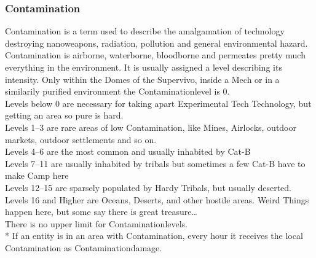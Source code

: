     \subsubsection{Contamination}
    Contamination is a term used to describe the amalgamation of technology destroying nanoweapons, radiation, pollution
    and general environmental hazard.
    Contamination is airborne, waterborne, bloodborne and permeates pretty much
    everything in the environment.
    It is usually assigned a level describing its intensity.
    Only within the Domes
    of the Supervivo, inside a Mech or in a similarily purified environment the Contaminationlevel is 0. \\
    Levels below 0 are necessary for taking apart Experimental Tech Technology, but getting an area so pure is hard.\\
    Levels 1--3
    are rare areas of low Contamination, like Mines, Airlocks, outdoor markets, outdoor settlements and so on. \\
    Levels 4--6
    are the most common and usually inhabited by Cat-B\\
    Levels 7--11
    are usually inhabited by tribals but sometimes a few Cat-B have to make Camp here \\
    Levels 12--15
    are sparsely populated by Hardy Tribals, but usually deserted.\\
    Levels 16 and Higher
    are Oceans, Deserts, and other hostile areas.
    Weird Things happen here, but some say there is great treasure\ldots\\
    There is no upper limit for Contaminationlevels. \\*
    If an entity is in an area with Contamination, every hour it receives the local Contamination
    as Contaminationdamage.\par
